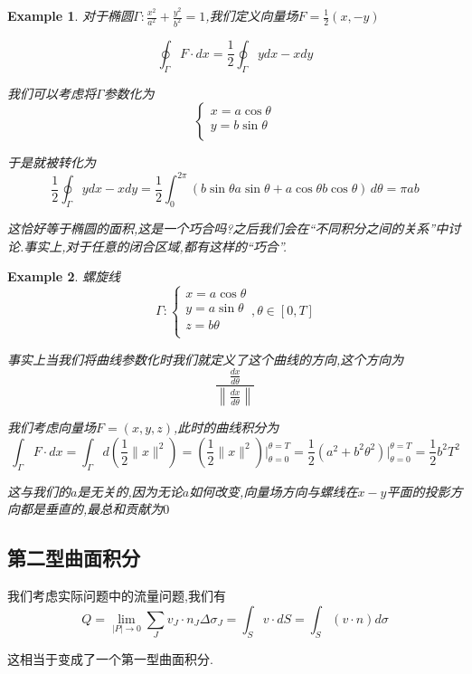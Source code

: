 \documentclass[11pt,hyperref,a4paper,UTF8]{ctexart}
\newtheorem{example}{Example}[subsection]
\newcommand{\parameter}[1]{\left(#1\right)}
\begin{document}
\begin{CJK}{UTF8}{gkai}
\begin{example}
  对于椭圆$\Gamma: \frac{x^2}{a^2} + \frac{y^2}{b^2} = 1$,我们定义向量场$F = \frac{1}{2}(x,-y)$

  \[\oint_\Gamma F \cdot dx = \frac{1}{2}\oint_\Gamma ydx - xdy\]

  我们可以考虑将$\Gamma$参数化为
  \[\begin{cases}
    x = a\cos \theta\\
    y = b\sin \theta\\
  \end{cases}\]

  于是就被转化为
  \[\frac{1}{2}\oint_\Gamma ydx - xdy = \frac{1}{2} \int_0^{2\pi} (b \sin \theta a \sin \theta + a \cos \theta b \cos \theta)\, d\theta = \pi ab\]

  这恰好等于椭圆的面积,这是一个巧合吗?之后我们会在``不同积分之间的关系''中讨论.事实上,对于任意的闭合区域,都有这样的``巧合''.
\end{example}

\begin{example}
  螺旋线
  \[\Gamma :\begin{cases}
    x = a\cos \theta\\
    y = a\sin \theta\\
    z = b\theta\\
  \end{cases},\theta \in [0,T]\]

  事实上当我们将曲线参数化时我们就定义了这个曲线的方向,这个方向为
  \[\frac{\frac{dx}{d\theta}}{\left\|\frac{dx}{d\theta}\right\|}\]

  我们考虑向量场$F = (x,y,z)$,此时的曲线积分为
  \[\int_\Gamma F\cdot dx = \int_\Gamma d \parameter{\frac{1}{2} \|x\|^2} = \parameter{\frac{1}{2}\|x\|^2}\bigg|_{\theta = 0}^{\theta = T} =  \frac{1}{2}\parameter{a^2 + b^2 \theta^2}\bigg|_{\theta = 0}^{\theta = T} = \frac{1}{2}b^2 T^2\]

  这与我们的$a$是无关的,因为无论$a$如何改变,向量场方向与螺线在$x-y$平面的投影方向都是垂直的,最总和贡献为$0$
\end{example}

\subsection{第二型曲面积分}
我们考虑实际问题中的流量问题,我们有
\[Q = \lim_{|P| \to 0} \sum_{J} v_J \cdot n_J \Delta \sigma_J = \int_S v \cdot dS = \int_S (v \cdot n) d\sigma \]

这相当于变成了一个第一型曲面积分.


\end{CJK}
\end{document}
